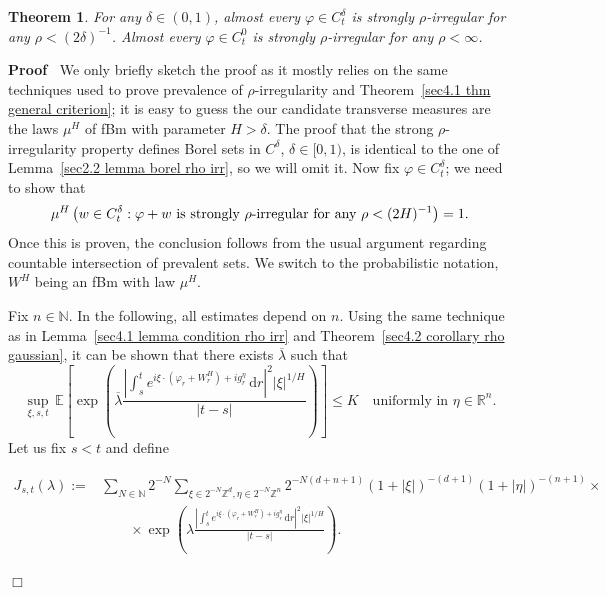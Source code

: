 \documentclass[10pt]{article}
\newcommand{\assign}{:=}
\newcommand{\mathd}{\mathrm{d}}
\newenvironment{proof}{\noindent\textbf{Proof\ }}{\hspace*{\fill}$\Box$\medskip}
\newtheorem{theorem}{Theorem}
\begin{document}
\begin{theorem}
  \label{sec5.3 thm prevalence strong rho}For any $\delta \in (0, 1)$, almost
  every $\varphi \in C^{\delta}_t$ is strongly $\rho$-irregular for any $\rho
  < (2 \delta)^{- 1}$. Almost every $\varphi \in C^0_t$ is strongly
  $\rho$-irregular for any $\rho < \infty$.
\end{theorem}

\begin{proof}
  We only briefly sketch the proof as it mostly relies on the same techniques
  used to prove prevalence of $\rho$-irregularity and Theorem~\ref{sec4.1 thm
  general criterion}; it is easy to guess the our candidate transverse
  measures are the laws $\mu^H$ of fBm with parameter $H > \delta$. The proof
  that the strong $\rho$\mbox{-}irregularity property defines Borel sets in
  $C^{\delta}$, $\delta \in [0, 1)$, is identical to the one of
  Lemma~\ref{sec2.2 lemma borel rho irr}, so we will omit it. Now fix $\varphi
  \in C^{\delta}_t$; we need to show that
  \[ \mu^H \left( w \in C^{\delta}_t : \varphi + w \text{ is strongly
     $\rho$\mbox{-}irregular for any } \rho < (2 H)^{- 1} \right) = 1. \]
  Once this is proven, the conclusion follows from the usual argument
  regarding countable intersection of prevalent sets. We switch to the
  probabilistic notation, $W^H$ being an fBm with law $\mu^H$.
  
  Fix $n \in \mathbb{N}$. In the following, all estimates depend on $n$.
  Using the same technique as in Lemma~\ref{sec4.1 lemma condition rho irr}
  and Theorem~\ref{sec4.2 corollary rho gaussian}, it can be shown that there
  exists $\overline{\lambda}$ such that
  \[ \sup_{\xi, s, t} \, \mathbb{E} \left[ \exp \left( \overline{\lambda} 
     \frac{\left| \int_s^t e^{i \xi \cdot (\varphi_r + W^H_r) + i g^{\eta}_r}
     \, \mathd r \right|^2 | \xi |^{1 / H}}{| t - s |} \right) \right]
     \leqslant K \quad \text{uniformly in $\eta \in \mathbb{R}^n$.} \]
  Let us fix $s < t$ and define
  
  \begin{align}
    J_{s, t} (\lambda) \assign & \sum_{N \in \mathbb{N}} 2^{- N} \sum_{\xi \in
    2^{- N} \mathbb{Z}^d, \eta \in 2^{- N} \mathbb{Z}^n} 2^{- N (d + n + 1)}
    (1 + | \xi |)^{- (d + 1)} (1 + | \eta |)^{- (n + 1)} \times\\
    & \qquad \times \exp \left( \lambda \frac{\left| \int_s^t e^{i \xi \cdot
    (\varphi_r + W^H_r) + i g^{\eta}_r} \, \mathd r \right|^2 | \xi |^{1 /
    H}}{| t - s |} \right) .
  \end{align}
  

\end{proof}
\end{document}
